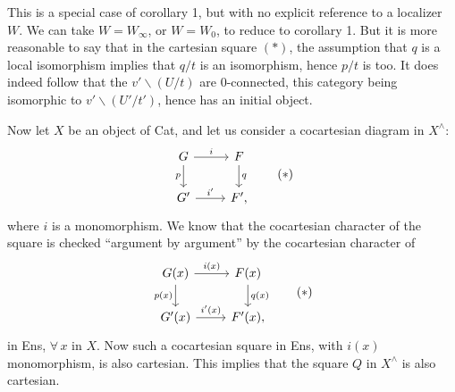 \documentclass[11pt]{article}
\newcommand{\printedpage}[1]{\marginpar{\footnotesize p.~#1}}
\newcommand{\msp}[1]{\marginpar{\footnotesize [#1]}}
\begin{document}
This is a special case of corollary 1, but with no explicit reference to a localizer $W$. We can take $W = W_{\infty}$, or $W = W_0$, to reduce to corollary 1. But it is more reasonable to say that in the cartesian square $(*)$, the assumption that $q$ is a local isomorphism implies that $q/t$ is an isomorphism, hence $p/t$ is too. It does indeed follow that the $v' \backslash (U/t)$ are 0-connected, this category being isomorphic to $v' \backslash (U'/t')$, hence has an initial object. %

Now let $X$ be an object of Cat, and let us consider a cocartesian diagram in $X^{\wedge}$:
\[
\begin{tikzcd}
G \ar[r, "i"] \ar[d, "p"'] & F \ar[d, "q"] \\
G' \ar[r, "i'"] & F',
\end{tikzcd}
\tag*{$(*)$}
\]
\printedpage{111}
\msp{page 162}
where $i$ is a monomorphism. We know that the cocartesian character of the square is checked ``argument by argument'' by the cocartesian character of
\[
\begin{tikzcd}
G(x) \ar[r, "i(x)"] \ar[d, "p(x)"'] & F(x) \ar[d, "q(x)"] \\
G'(x) \ar[r, "i'(x)"] & F'(x),
\end{tikzcd}
\tag*{$(*)$}
\]
in Ens, $\forall\, x$ in $X$. Now such a cocartesian square in Ens, with $i(x)$ monomorphism, is also cartesian. This implies that the square $Q$ in $X^{\wedge}$ is also cartesian.
\end{document}
